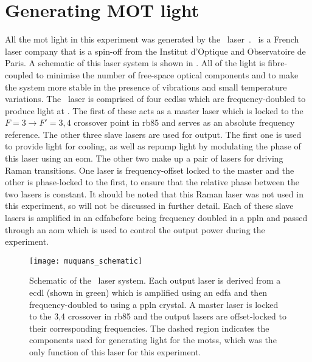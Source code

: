 \section{Generating MOT light}
All the \ac{mot} light in this experiment was generated by the \Muquans\
laser~\cite{muquansWebPage}. \Muquans\ is a French laser company that is a
spin-off from the Institut d'Optique and Observatoire de Paris. A schematic of
this laser system is shown in \FigureRef{fig:muquans_schematic}. All of the
light is fibre-coupled to minimise the number of free-space optical components
and to make the system more stable in the presence of vibrations and small
temperature variations. The \Muquans\ laser is comprised of four
\sivalue{1560}{\nano\metre} \acp{ecdls} which are frequency-doubled to produce
light at \sivalue{780}{\nano\metre}. The first of these acts as a master laser
which is locked to the \(F = 3 \rightarrow F' = 3,4\) crossover point in
\ac{rb85} and serves as an absolute frequency reference. The other three slave
lasers are used for output. The first one is used to provide light for cooling,
as well as repump light by modulating the phase of this laser using an \ac{eom}.
The other two make up a pair of lasers for driving Raman transitions. One laser
is frequency-offset locked to the master and the other is phase-locked to the
first, to ensure that the relative phase between the two lasers is constant. It
should be noted that this Raman laser was not used in this experiment, so will
not be discussed in further detail. Each of these slave lasers is amplified in
an \ac{edfa}before being frequency doubled in a \ac{ppln} and passed through an
\ac{aom} which is used to control the output power during the experiment.
\begin{figure}
    \texttt{[image: muquans\_schematic]}
    \caption[\Muquans\ Laser System Diagram]{Schematic of the \Muquans\ laser system. Each output laser is derived from a \acs{ecdl} (shown in green) which is amplified using an \acs{edfa} and then frequency-doubled to  using a \acs{ppln} crystal. A master laser is locked to the 3,4 crossover in \ac{rb85} and the output lasers are offset-locked to their corresponding frequencies. The dashed region indicates the components used for generating light for the \acp{mots}, which was the only function of this laser for this experiment.}\label{fig:muquans_schematic}
\end{figure}
